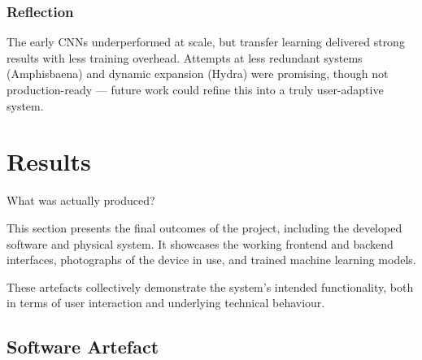             \subsubsection*{Reflection}
                The early CNNs underperformed at scale, but transfer learning delivered strong results with less training overhead. Attempts at less redundant systems (Amphisbaena) and dynamic expansion (Hydra) were promising, though not production-ready — future work could refine this into a truly user-adaptive system.
    
    \section{Results} %
        \begin{temp}
            What was actually produced?
        \end{temp}
    
        This section presents the final outcomes of the project, including the developed software and physical system. It showcases the working frontend and backend interfaces, photographs of the device in use, and trained machine learning models.
    
        These artefacts collectively demonstrate the system’s intended functionality, both in terms of user interaction and underlying technical behaviour.
        
        \subsection{Software Artefact}
    
